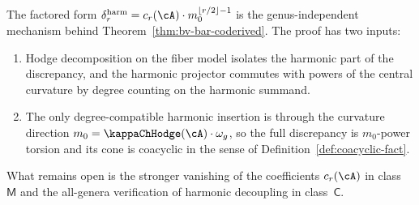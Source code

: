 \begin{remark}
\label{rem:bv-bar-coderived-higher-genus}%
%
The factored form
$\delta_r^{\mathrm{harm}} = c_r(\cA) \cdot m_0^{\lfloor r/2 \rfloor - 1}$
is the genus-independent mechanism behind
Theorem~\ref{thm:bv-bar-coderived}. The proof has two inputs:
\begin{enumerate}[label=\textup{(\roman*)},nosep]
\item Hodge decomposition on the fiber model isolates the harmonic
 part of the discrepancy, and the harmonic projector commutes with
 powers of the central curvature by degree counting on the harmonic
 summand.
\item The only degree-compatible harmonic insertion is through the
 curvature direction
 $m_0 = \kappaChHodge(\cA)\cdot\omega_g$, so the full discrepancy is
 $m_0$-power torsion and its cone is coacyclic in the sense of
 Definition~\ref{def:coacyclic-fact}.
\end{enumerate}
What remains open is the stronger vanishing of the coefficients
$c_r(\cA)$ in class~$\mathsf{M}$ and the all-genera verification of
harmonic decoupling in class~$\mathsf{C}$.
\end{remark}

